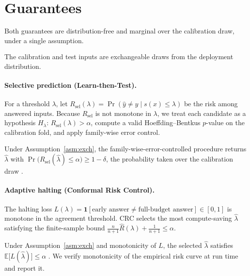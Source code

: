 \section{Guarantees}
\label{sec:guarantees}

Both guarantees are distribution-free and marginal over the calibration draw, under a single
assumption.

\begin{assumption}[Exchangeability]
\label{asm:exch}
The calibration and test inputs are exchangeable draws from the deployment distribution.
\end{assumption}

\paragraph{Selective prediction (Learn-then-Test).} For a threshold $\lambda$, let
$R_{\mathrm{sel}}(\lambda)=\Pr(\hat y \ne y \mid s(x)\le\lambda)$ be the risk among answered inputs.
Because $R_{\mathrm{sel}}$ is not monotone in $\lambda$, we treat each candidate as a hypothesis
$H_\lambda\!:\,R_{\mathrm{sel}}(\lambda)>\alpha$, compute a valid Hoeffding--Bentkus $p$-value on the
calibration fold, and apply family-wise error control.

\begin{proposition}
\label{prop:ltt}
Under Assumption~\ref{asm:exch}, the family-wise-error-controlled procedure returns $\hat\lambda$
with $\Pr\!\big(R_{\mathrm{sel}}(\hat\lambda) \le \alpha\big) \ge 1-\delta$, the probability taken
over the calibration draw \citep{ltt2021}.
\end{proposition}

\paragraph{Adaptive halting (Conformal Risk Control).} The halting loss
$L(\lambda)=\mathbf 1[\text{early answer}\ne\text{full-budget answer}]\in[0,1]$ is monotone in the
agreement threshold. CRC selects the most compute-saving $\hat\lambda$ satisfying the finite-sample
bound $\tfrac{n}{n+1}\widehat R(\lambda) + \tfrac{1}{n+1} \le \alpha$.

\begin{proposition}
\label{prop:crc}
Under Assumption~\ref{asm:exch} and monotonicity of $L$, the selected $\hat\lambda$ satisfies
$\mathbb E\big[L(\hat\lambda)\big]\le\alpha$ \citep{crc2022}. We verify monotonicity of
the empirical risk curve at run time and report it.
\end{proposition}

